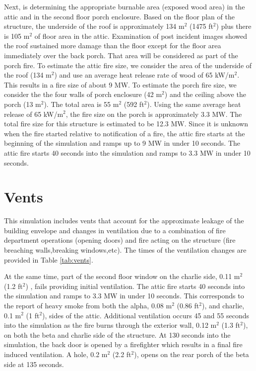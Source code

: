 \documentclass[11pt,oneside]{book}
\begin{document}
Next, is determining the appropriate burnable area (exposed wood area) in the attic and in the second floor porch enclosure. Based on the floor plan of the structure, the underside of the roof is approximately 134 m$^2$ (1475 ft$^2$) plus there is 105 m$^2$ of floor area in the attic. Examination of post incident images showed the roof sustained more damage than the floor except for the floor area immediately over the back porch. That area will be considered as part of the porch fire. To estimate the attic fire size, we consider the area of the underside of the roof (134 m$^2$) and use an average heat release rate of wood of 65 kW/m$^2$. This results in a fire size of about 9 MW. To estimate the porch fire size, we consider the the four walls of porch enclosure (42 m$^2$) and the ceiling above the porch (13 m$^2$). The total area is 55 m$^2$ (592 ft$^2$). Using the same average heat release of 65 kW/m$^2$, the fire size on the porch is approximately 3.3 MW. The total fire size for this structure is estimated to be 12.3 MW. Since it is unknown when the fire started relative to notification of a fire, the attic fire starts at the beginning of the simulation and ramps up to 9 MW in under 10 seconds. The attic fire starts 40 seconds into the simulation and ramps to 3.3 MW in under 10 seconds.

\section{Vents}
\label{Vents}
This simulation includes vents that account for the approximate leakage of the building envelope and changes in ventilation due to a combination of fire department operations (opening doors) and fire acting on the structure (fire breaching walls,breaking windows,etc). The times of the ventilation changes are provided in Table \ref{tab:vents}.


At the same time, part of the second floor window on the charlie side, 0.11 m$^2$ (1.2 ft$^2$) , fails providing initial ventilation.  The attic fire starts 40 seconds into the simulation and ramps to 3.3 MW in under 10 seconds. This corresponds to the report of heavy smoke from both the alpha, 0.08 m$^2$ (0.86 ft$^2$), and charlie, 0.1 m$^2$ (1 ft$^2$), sides of the attic. Additional ventilation occurs 45 and 55 seconds into the simulation as the fire burns through the exterior wall, 0.12 m$^2$ (1.3 ft$^2$), on both the beta and charlie side of the structure. At 130 seconds into the simulation, the back door is opened by a firefighter which results in a final fire induced ventilation. A hole, 0.2 m$^2$ (2.2 ft$^2$), opens on the rear porch of the beta side at 135 seconds.
\end{document}
